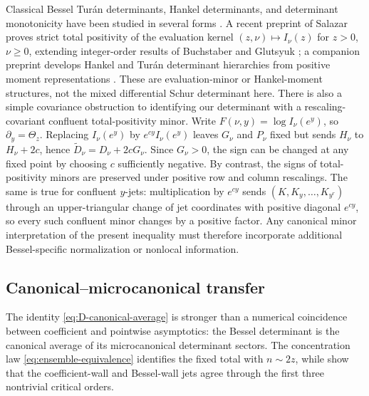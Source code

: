 \documentclass[11pt,a4paper]{amsart}
\numberwithin{equation}{section}
\theoremstyle{plain}
\theoremstyle{definition}
\newcommand{\Thetaz}{\Theta_z}
\begin{document}
Classical Bessel Tur\'an determinants, Hankel determinants, and determinant
monotonicity have been studied in several forms
\cite{BariczPogany2014TuranDeterminants,BustozIsmail1997TuranOrthogonal,IsmailLaforgia2007Monotonicity,MezoBaricz2017Turanian}.
A recent preprint of Salazar proves strict total positivity of the evaluation
kernel \((z,\nu)\mapsto I_\nu(z)\) for \(z>0\), \(\nu\ge0\), extending
integer-order results of Buchstaber and Glutsyuk
\cite{Salazar2026Darboux,BuchstaberGlutsyuk2019TotalPositivity}; a companion
preprint develops Hankel and Tur\'an determinant hierarchies from positive
moment representations \cite{Salazar2026Hankel}.  These are evaluation-minor
or Hankel-moment structures, not the mixed differential Schur determinant here.
There is also a simple covariance obstruction to identifying our determinant
with a rescaling-covariant confluent total-positivity minor.  Write
\(F(\nu,y)=\log I_\nu(e^y)\), so \(\partial_y=\Thetaz\).  Replacing
\(I_\nu(e^y)\) by \(e^{cy}I_\nu(e^y)\) leaves \(G_\nu\) and \(P_\nu\) fixed
but sends \(H_\nu\) to \(H_\nu+2c\), hence
\(\widetilde D_\nu=D_\nu+2cG_\nu\).
Since \(G_\nu>0\), the sign can be changed at any fixed point by choosing
\(c\) sufficiently negative.  By contrast, the signs of total-positivity
minors are preserved under positive row and column rescalings.  The same is
true for confluent \(y\)-jets: multiplication by \(e^{cy}\) sends
\((K,K_y,\ldots,K_{y^r})\) through an upper-triangular change of jet coordinates
with positive diagonal \(e^{cy}\), so every such confluent minor changes by a
positive factor.  Any canonical minor interpretation of the present inequality
must therefore incorporate additional Bessel-specific normalization or
nonlocal information.

\subsection{Canonical--microcanonical transfer}\label{subsec:canonical-microcanonical-transfer}

The identity \eqref{eq:D-canonical-average} is stronger than a numerical
coincidence between coefficient and pointwise asymptotics: the Bessel
determinant is the canonical average of its microcanonical determinant
sectors.  The concentration law \eqref{eq:ensemble-equivalence} identifies the
fixed total with \(n\sim2z\), while 
show that the coefficient-wall and Bessel-wall jets agree through the first
three nontrivial critical orders.
\end{document}
